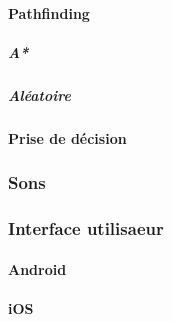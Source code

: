 		\hypertarget{IA}{}
		\label{IA}
		
		\paragraph{Pathfinding}
			\subparagraph{A*}
			\subparagraph{Aléatoire}
			\paragraph{Prise de décision}
			

	\subsubsection{Sons}
	
		\hypertarget{Sons}{}
		\label{Sons}
	
	\subsubsection{Interface utilisaeur}
		\paragraph{Android}
		\paragraph{iOS}